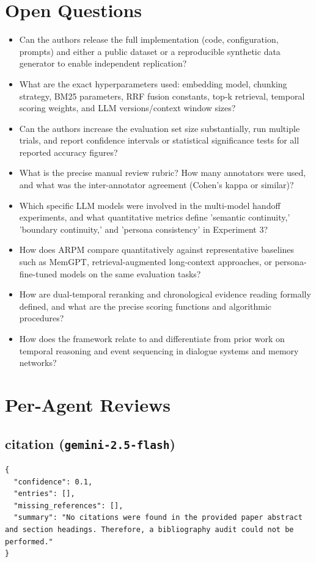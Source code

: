 \documentclass[11pt]{article}
\begin{document}
\section*{Open Questions}
\begin{itemize}[leftmargin=*]
  \item Can the authors release the full implementation (code, configuration, prompts) and either a public dataset or a reproducible synthetic data generator to enable independent replication?
  \item What are the exact hyperparameters used: embedding model, chunking strategy, BM25 parameters, RRF fusion constants, top-k retrieval, temporal scoring weights, and LLM versions/context window sizes?
  \item Can the authors increase the evaluation set size substantially, run multiple trials, and report confidence intervals or statistical significance tests for all reported accuracy figures?
  \item What is the precise manual review rubric? How many annotators were used, and what was the inter-annotator agreement (Cohen's kappa or similar)?
  \item Which specific LLM models were involved in the multi-model handoff experiments, and what quantitative metrics define 'semantic continuity,' 'boundary continuity,' and 'persona consistency' in Experiment 3?
  \item How does ARPM compare quantitatively against representative baselines such as MemGPT, retrieval-augmented long-context approaches, or persona-fine-tuned models on the same evaluation tasks?
  \item How are dual-temporal reranking and chronological evidence reading formally defined, and what are the precise scoring functions and algorithmic procedures?
  \item How does the framework relate to and differentiate from prior work on temporal reasoning and event sequencing in dialogue systems and memory networks?
\end{itemize}

\section*{Per-Agent Reviews}
\subsection*{citation (\texttt{gemini-2.5-flash})}
\begin{verbatim}
{
  "confidence": 0.1,
  "entries": [],
  "missing_references": [],
  "summary": "No citations were found in the provided paper abstract and section headings. Therefore, a bibliography audit could not be performed."
}
\end{verbatim}
\end{document}
